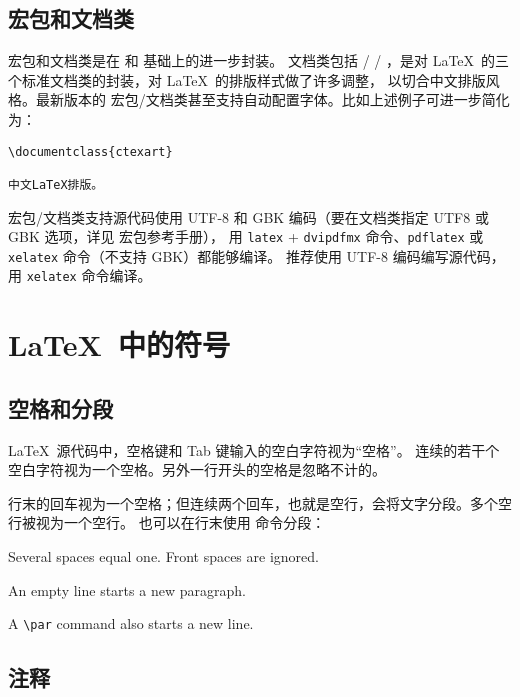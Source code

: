 \subsection{ 宏包和文档类}

 宏包和文档类是在  和  基础上的进一步封装。 文档类包括
 /  / ，是对 \LaTeX\ 的三个标准文档类的封装，对 \LaTeX\ 的排版样式做了许多调整，
以切合中文排版风格。最新版本的  宏包/文档类甚至支持自动配置字体。比如上述例子可进一步简化为：
\begin{verbatim}
\documentclass{ctexart}

中文LaTeX排版。

\end{verbatim}

 宏包/文档类支持源代码使用 UTF-8 和 GBK 编码（要在文档类指定 UTF8 或 GBK 选项，详见  宏包参考手册），
用 \texttt{latex} + \texttt{dvipdfmx} 命令、\texttt{pdflatex} 或 \texttt{xelatex} 命令（不支持 GBK）都能够编译。
推荐使用 UTF-8 编码编写源代码，用 \texttt{xelatex} 命令编译。

\section{\LaTeX\ 中的符号}

\subsection{空格和分段}\label{subsec:spaces}

\LaTeX\ 源代码中，空格键和 Tab 键输入的空白字符视为“空格”。
连续的若干个空白字符视为一个空格。另外一行开头的空格是忽略不计的。

行末的回车视为一个空格；但连续两个回车，也就是空行，会将文字分段。多个空行被视为一个空行。
也可以在行末使用  命令分段：
\begin{example}
Several spaces     equal one.
  Front spaces are ignored.

An empty line starts a new
paragraph.\par
A \verb|\par| command also 
starts a new line.
\end{example}

\subsection{注释}\label{subsec:comments}


